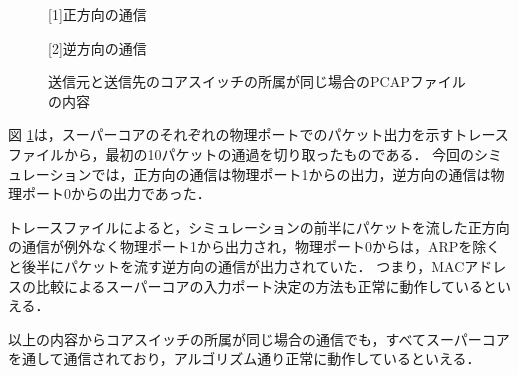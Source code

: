 \begin{figure}[tb]
	\begin{center}
		
		\begin{center}
			\hspace{1.6cm} [1]正方向の通信
		\end{center}
		
		\begin{center}
			\hspace{1.6cm} [2]逆方向の通信
		\end{center}
		\caption{送信元と送信先のコアスイッチの所属が同じ場合のPCAPファイルの内容}
		\label{fig:4-6}
	\end{center}
\end{figure}

図 \ref{fig:4-6}は，スーパーコアのそれぞれの物理ポートでのパケット出力を示すトレースファイルから，最初の10パケットの通過を切り取ったものである．
今回のシミュレーションでは，正方向の通信は物理ポート1からの出力，逆方向の通信は物理ポート0からの出力であった．

トレースファイルによると，シミュレーションの前半にパケットを流した正方向の通信が例外なく物理ポート1から出力され，物理ポート0からは，ARPを除くと後半にパケットを流す逆方向の通信が出力されていた．
つまり，MACアドレスの比較によるスーパーコアの入力ポート決定の方法も正常に動作しているといえる．

以上の内容からコアスイッチの所属が同じ場合の通信でも，すべてスーパーコアを通して通信されており，アルゴリズム通り正常に動作しているといえる．

